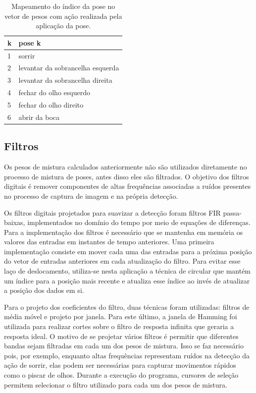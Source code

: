 \begin{table}[!htb]
\centering
\begin{tabular}{|l|l|}
\hline
k & pose k  \\ \hline
1 & sorrir  \\ \hline
2 & levantar da sobrancelha esquerda\\ \hline
3 & levantar da sobrancelha direita \\ 	\hline
4 & fechar do olho esquerdo  \\ \hline
5 & fechar do olho direito \\ \hline
6 & abrir da boca  \\ \hline
\end{tabular}
\caption{Mapeamento do índice da pose no vetor de pesos com ação realizada pela aplicação da pose.}
\label{tab:poses-descr}
\end{table}



\subsection{Filtros}

Os pesos de mistura calculados anteriormente não são utilizados diretamente no processo de mistura de poses, antes disso eles são filtrados. O objetivo dos filtros digitais é remover componentes de altas frequências associadas a ruídos presentes no processo de captura de imagem e na própria detecção. 

Os filtros digitais projetados para suavizar a detecção foram filtros FIR passa-baixas, implementados no domínio do tempo por meio de equações de diferenças. Para a implementação dos filtros é necessário que se mantenha em memória os valores das entradas em instantes de tempo anteriores. Uma primeira implementação consiste em mover cada uma das entradas para a próxima posição do vetor de entradas anteriores em cada atualização do filtro. Para evitar esse laço de deslocamento, utiliza-se nesta aplicação a técnica de  circular que mantém um índice para a posição mais recente e atualiza esse índice ao invés de atualizar a posição dos dados em si.


Para o projeto dos coeficientes do filtro, duas técnicas foram utilizadas: filtros de média móvel e projeto por janela. Para este último, a janela de Hamming foi utilizada para realizar cortes sobre o filtro de resposta infinita que geraria a resposta ideal. O motivo de se projetar vários filtros é permitir que diferentes bandas sejam filtradas em cada um dos pesos de mistura. Isso se faz necessário pois, por exemplo, enquanto altas frequências representam ruídos na detecção da ação de sorrir, elas podem ser necessárias para capturar movimentos rápidos como o piscar de olhos. Durante a execução do programa, cursores de seleção permitem selecionar o filtro utilizado para cada um dos pesos de mistura.


